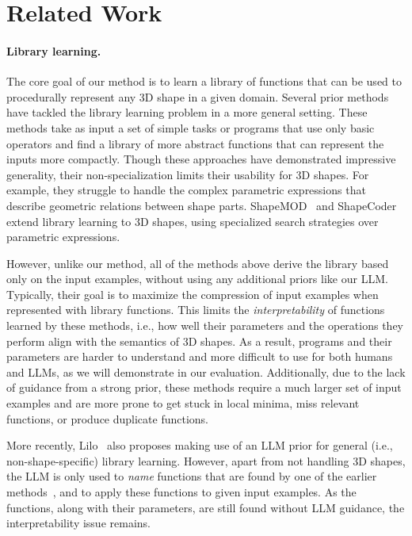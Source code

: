 \section{Related Work}
\paragraph{Library learning.}

The core goal of our method is to learn a library of functions that can be used to procedurally represent any 3D shape in a given domain. Several prior methods~\cite{ellis2018library, ellis2021dreamcoder, topdownlib, babble, bellur2024leroy} have tackled the library learning problem in a more general setting. These methods take as input a set of simple tasks or programs that use only basic operators and find a library of more abstract functions that can represent the inputs more compactly.
Though these approaches have demonstrated impressive generality, their non-specialization limits their usability for 3D shapes. 
For example, they struggle to handle the complex parametric expressions that describe geometric relations between shape parts.
ShapeMOD~\cite{jones2021shapeMOD} and ShapeCoder~\cite{jones2023shapecoder} extend library learning to 3D shapes, using specialized search strategies over parametric expressions.

However, unlike our method, all of the methods above derive the library based only on the input examples, without using any additional priors like our LLM. Typically, their goal is to maximize the compression of input examples when represented with library functions. This limits the \emph{interpretability} of functions learned by these methods, i.e., how well their parameters and the operations they perform align with the semantics of 3D shapes. As a result, programs and their parameters are harder to understand and more difficult to use for both humans and LLMs, as we will demonstrate in our evaluation. Additionally, due to the lack of guidance from a strong prior, these methods require a much larger set of input examples and are more prone to get stuck in local minima, miss relevant functions, or produce duplicate functions.

More recently, Lilo~\cite{grand2024lilo} also proposes making use of an LLM prior for general (i.e., non-shape-specific) library learning. However, apart from not handling 3D shapes, the LLM is only used to \emph{name} functions that are found by one of the earlier methods~\cite{topdownlib}, and to apply these functions to given input examples. As the functions, along with their parameters, are still found without LLM guidance, the interpretability issue remains.


